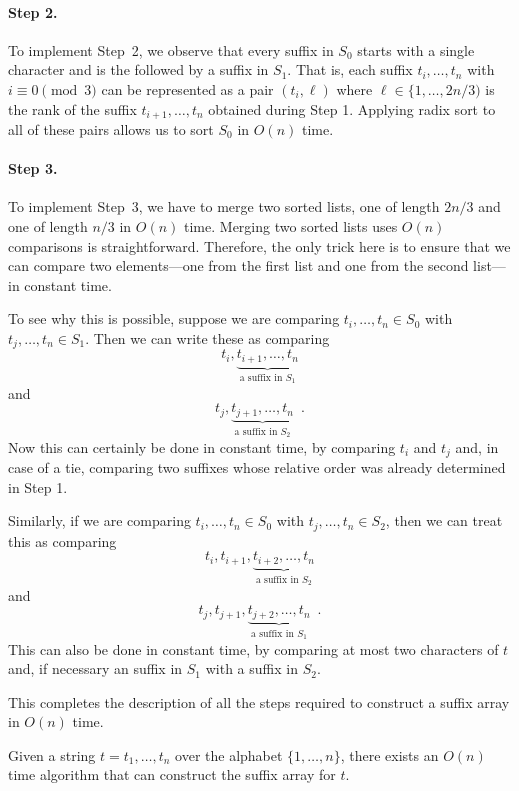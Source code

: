 \paragraph{Step 2.}
To implement Step~2, we observe that every suffix in $S_0$ starts with
a single character and is the followed by a suffix in $S_1$.  That is,
each suffix $t_i,\ldots,t_n$ with $i\equiv 0\pmod 3$ can be represented
as a pair $(t_i,\ell)$ where $\ell\in\{1,\ldots,2n/3)$ is the rank of
the suffix $t_{i+1},\ldots,t_n$ obtained during Step 1.  Applying radix
sort to all of these pairs allows us to sort $S_0$ in $O(n)$ time.

\paragraph{Step 3.}
To implement Step~3, we have to merge two sorted lists, one of length $2n/3$ and one of length $n/3$ in $O(n)$ time.  Merging two sorted lists uses $O(n)$ comparisons is straightforward. Therefore, the only trick here is to ensure that we can compare two elements---one from the first list and one from the second list---in constant time.  

To see why this is possible, suppose we are comparing $t_i,\ldots,t_n\in S_0$ with $t_j,\ldots,t_n\in S_1$.  Then we can write these as comparing
\[
   t_i,\underbrace{t_{i+1},\ldots,t_n}_{\text{a suffix in $S_1$}}
\]
and 
\[
   t_j,\underbrace{t_{j+1},\ldots,t_n}_{\text{a suffix in $S_2$}}
    \enspace .
\]
Now this can certainly be done in constant time, by comparing $t_i$ and $t_j$ and, in case of a tie, comparing two suffixes whose relative order was already determined in Step 1.

Similarly, if we are comparing 
$t_i,\ldots,t_n\in S_0$ with $t_j,\ldots,t_n\in S_2$, then we can treat this as comparing
\[
   t_i,t_{i+1},\underbrace{t_{i+2},\ldots,t_n}_{\text{a suffix in $S_2$}}
\]
and 
\[
   t_j,t_{j+1},\underbrace{t_{j+2},\ldots,t_n}_{\text{a suffix in $S_1$}}
    \enspace .
\]
This can also be done in constant time, by comparing at most two
characters of $t$ and, if necessary an suffix in $S_1$ with a suffix
in $S_2$.

This completes the description of all the steps required to construct a suffix array in $O(n)$ time.

\begin{thm}
  Given a string $t=t_1,\ldots,t_n$ over the alphabet $\{1,\ldots,n\}$,
  there exists an $O(n)$ time algorithm that can construct the suffix
  array for $t$.
\end{thm}

